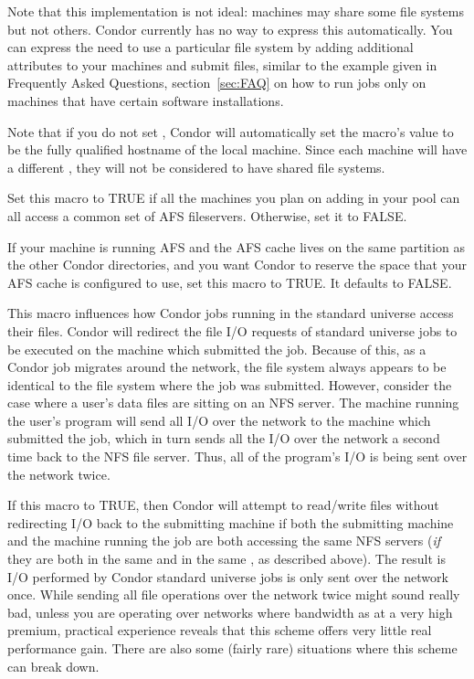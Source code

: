 \begin{description}
Note that this implementation is not ideal: machines may share some
file systems but not others. Condor currently has no way to express
this automatically. You can express the need to use a
particular file system by adding additional attributes to your machines
and submit files, similar to the example given in 
Frequently Asked Questions, 
section~\ref{sec:FAQ} on
how to run jobs only on machines that have 
certain software installations.

Note that if you do not set 
, Condor will
automatically set the macro's value to be the fully qualified hostname
of the local machine.
Since each machine will have a different
,
they will not be considered to have shared file systems.

  
\item[\Macro{HAS\_AFS}] \label{param:HasAfs} Set this macro to TRUE if
  all the machines you plan on adding in your pool can all access a
  common set of AFS fileservers.  Otherwise, set it to FALSE.
      
\item[\Macro{RESERVE\_AFS\_CACHE}] \label{param:ReserveAfsCache} If
  your machine is running AFS and the AFS cache lives on the same
  partition as the other Condor directories, and you want Condor to
  reserve the space that your AFS cache is configured to use, set this
  macro to TRUE.  It defaults to FALSE.
  
\item[\Macro{USE\_NFS}] \label{param:UseNfs} This macro influences
  how Condor jobs running in the standard universe access their
  files.  Condor will redirect the file I/O requests
  of standard universe jobs to be executed on the machine which
  submitted the job.  Because of this, as a Condor job migrates around
  the network, the file system always appears to be identical to the
  file system where the job was submitted.  However, consider the case
  where a user's data files are sitting on an NFS server. The machine
  running the user's program will send all I/O over the network to the
  machine which submitted the job, which in turn sends all the I/O
  over the network a second time back to the NFS file server. Thus,
  all of the program's I/O is being sent over the network twice.
          
  If this macro to TRUE, then Condor will attempt to
  read/write files without redirecting I/O back to the submitting
  machine if both the submitting machine and the machine running the job
  are both accessing the same NFS servers (\emph{if} they are both in the
  same  and in the same ,
  as described above).  The result is I/O performed by Condor standard
  universe jobs is only sent over the network once.  
  While sending all file operations over the network twice might sound
  really bad, unless you are operating over networks where bandwidth
  as at a very high premium, practical experience reveals that this
  scheme offers very little real performance gain.  There are also
  some (fairly rare) situations where this scheme can break down.
  

\end{description}
